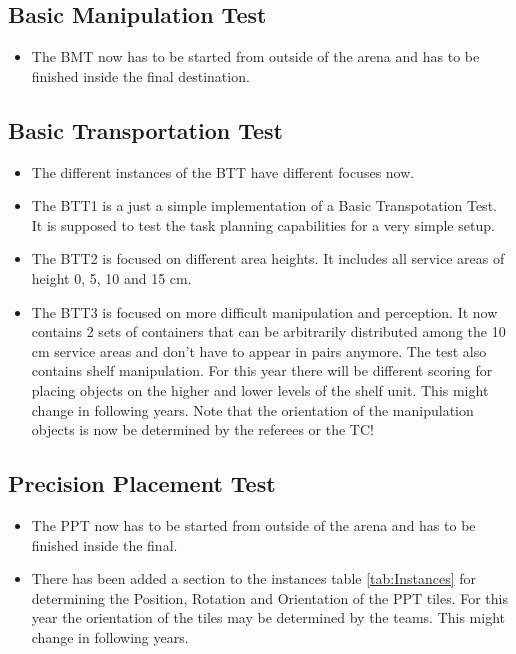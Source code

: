 \subsection{Basic Manipulation Test}
\begin{itemize}
  \item The BMT now has to be started from outside of the arena and has to be finished inside the final destination.
\end{itemize}

\subsection{Basic Transportation Test}\label{cl:BTT}
\begin{itemize}
  \item The different instances of the BTT have different focuses now.
  \item The BTT1 is a just a simple implementation of a Basic Transpotation Test. It is supposed to test the task planning capabilities for a very simple setup.
  \item The BTT2 is focused on different area heights. It includes all service areas of height 0, 5, 10 and 15 cm.
  \item The BTT3 is focused on more difficult manipulation and perception. It now contains 2 sets of containers that can be arbitrarily distributed among the 10 cm service areas and don't have to appear in pairs anymore. The test also contains shelf manipulation. For this year there will be different scoring for placing objects on the higher and lower levels of the shelf unit. This might change in following years. Note that the orientation of the manipulation objects is now be determined by the referees or the TC!
\end{itemize}

\subsection{Precision Placement Test}
\begin{itemize}
  \item The PPT now has to be started from outside of the arena and has to be finished inside the final.
  \item There has been added a section to the instances table \ref{tab:Instances} for determining the Position, Rotation and Orientation of the PPT tiles. For this year the orientation of the tiles may be determined by the teams. This might change in following years.
\end{itemize}

